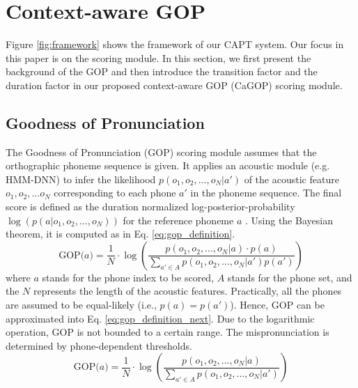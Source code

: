 \documentclass[a4paper]{article}
\begin{document}
\section{Context-aware GOP}
Figure \ref{fig:framework} shows the framework of our CAPT system. Our focus in this paper is on the scoring module. In this section, we first present the background of the GOP and then introduce the transition factor and the duration factor in our proposed context-aware GOP (CaGOP) scoring module.
\vspace{-4pt}
\subsection{Goodness of Pronunciation}
The Goodness of Pronunciation (GOP) scoring module assumes that the orthographic phoneme sequence is given. It applies an acoustic module (e.g. HMM-DNN) to infer the likelihood $p(o_1, o_2, ..., o_N|a')$ of the acoustic feature $o_1, o_2, ... o_N$ corresponding to each phone $a'$ in the phoneme sequence. The final score is defined as the duration normalized log-posterior-probability $\log(p(a|o_1, o_2, ..., o_N))$ for the reference phoneme $a$ \cite{witt1997computer}. Using the Bayesian theorem, it is computed as in Eq. \eqref{eq:gop_definition}.
\vspace{-4pt}
\begin{equation}
    \label{eq:gop_definition}
    \text{GOP(}a\text{)} = \frac{1}{N} \cdot \log(\frac{p(o_1, o_2, ..., o_N|a) \cdot p(a)}{\sum_{a'\in A} p(o_1, o_2, ..., o_N|a') p(a')})
\end{equation}
\noindent
where $a$ stands for the phone index to be scored, $A$ stands for the phone set, and the $N$ represents the length of the acoustic features. Practically, all the phones are assumed to be equal-likely (i.e., $p(a)=p(a')$). Hence, GOP can be approximated into Eq. \eqref{eq:gop_definition_next}. Due to the logarithmic operation, GOP is not bounded to a certain range. The mispronunciation is determined by phone-dependent thresholds.
\begin{equation}
    \label{eq:gop_definition_next}
    \text{GOP(}a\text{)} = \frac{1}{N} \cdot \log(\frac{p(o_1, o_2, ..., o_N|a)}{\sum_{a'\in A} p(o_1, o_2, ..., o_N|a')})
\end{equation}
\end{document}
